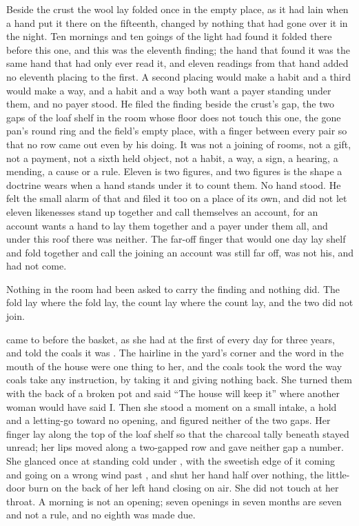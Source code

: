 Beside the crust the wool lay folded once in the empty place, as it had lain when a hand put it there on the fifteenth, changed by nothing that had gone over it in the night. Ten mornings and ten goings of the light had found it folded there before this one, and this was the eleventh finding; the hand that found it was the same hand that had only ever read it, and eleven readings from that hand added no eleventh placing to the first. A second placing would make a habit and a third would make a way, and a habit and a way both want a payer standing under them, and no payer stood. He filed the finding beside the crust's gap, the two gaps of the loaf shelf in the room whose floor does not touch this one, the gone pan's round ring and the field's empty place, with a finger between every pair so that no row came out even by his doing. It was not a joining of rooms, not a gift, not a payment, not a sixth held object, not a habit, a way, a sign, a hearing, a mending, a cause or a rule. Eleven is two figures, and two figures is the shape a doctrine wears when a hand stands under it to count them. No hand stood. He felt the small alarm of that and filed it too on a place of its own, and did not let eleven likenesses stand up together and call themselves an account, for an account wants a hand to lay them together and a payer under them all, and under this roof there was neither. The far-off finger that would one day lay shelf and fold together and call the joining an account was still far off, was not his, and had not come.

Nothing in the room had been asked to carry the finding and nothing did. The fold lay where the fold lay, the count lay where the count lay, and the two did not join.

\scenebreak

 came to  before the basket, as she had at the first of every day for three years, and told the coals it was . The hairline in the yard's corner and the word in the mouth of the house were one thing to her, and the coals took the word the way coals take any instruction, by taking it and giving nothing back. She turned them with the back of a broken pot and said “The house will keep it” where another woman would have said I. Then she stood a moment on a small intake, a hold and a letting-go toward no opening, and figured neither of the two gaps. Her finger lay along the top of the loaf shelf so that the charcoal tally beneath stayed unread; her lips moved along a two-gapped row and gave neither gap a number. She glanced once at  standing cold under , with the sweetish edge of it coming and going on a wrong wind past , and shut her hand half over nothing, the little-door burn on the back of her left hand closing on air. She did not touch  at her throat. A morning is not an opening; seven openings in seven months are seven and not a rule, and no eighth was made due.

